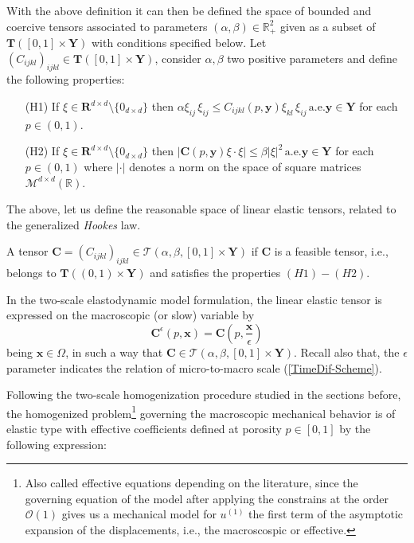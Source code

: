 With the above definition it can then be defined the space of bounded and coercive tensors associated to parameters $(\alpha,\beta) \in \mathbb{R}^2_+$ given as a subset of $\mathbf{T}([0,1]\times \mathbf{Y})$ with conditions specified below.
Let $(C_{ijkl})_{ijkl} \in \mathbf{T}([0,1]\times \mathbf{Y})$, consider $\alpha, \beta$ two positive parameters and define the following properties:
\begin{enumerate}
    \item[(H1)] If $\xi \in \mathbf{R}^{d\times d} \setminus \{0_{d \times d}\}$ then $\alpha \xi_{ij} \, \xi_{ij} \leq C_{ijkl}(p,\mathbf{y})  \xi_{kl}\,\xi_{ij}\, \text{a.e.} \mathbf{y} \in \mathbf{Y}$ for each $p \in (0,1)$.
    \item[(H2)] If $\xi \in \mathbf{R}^{d\times d} \setminus \{0_{d \times d}\}$ then $\vert \mathbf{C}(p,\mathbf{y}) \xi\cdot \xi \vert \leq \beta \vert \xi \vert^2 \, \text{a.e.}\mathbf{y} \in \mathbf{Y}$ for each $p \in (0,1)$ where $\vert \cdot \vert$ denotes a norm on the space of square matrices $\mathcal{M}^{d\times d}(\mathbb{R})$.
\end{enumerate}
The above, let us define the reasonable space of linear elastic tensors, related to the generalized \textit{Hookes} law.
\begin{defn}
A tensor $\mathbf{C} = (C_{ijkl})_{ijkl} \in \mathcal{T}(\alpha, \beta, [0,1]\times \mathbf{Y})$
if $\mathbf{C}$ is a feasible tensor, i.e., belongs to $\mathbf{T}((0,1)\times \mathbf{Y})$ and satisfies the properties $(H1)-(H2)$.
\end{defn}
\begin{rem}
In the two-scale elastodynamic model formulation, the linear elastic tensor is expressed on the macroscopic (or slow) variable by
\begin{equation*}
    \mathbf{C}^{\epsilon}(p,\mathbf{x}) =\mathbf{C}(p,\frac{\mathbf{x}}{\epsilon})
\end{equation*} being $\mathbf{x}\in \Omega$, in such a way that $\mathbf{C} \in \mathcal{T}(\alpha, \beta, [0,1]\times \mathbf{Y})$. Recall also that, the $\epsilon$ parameter indicates the relation of micro-to-macro scale (\ref{TimeDif-Scheme}).
\end{rem}
Following the two-scale homogenization procedure studied in the sections before, the homogenized problem\footnote{Also called effective equations depending on the literature, since the governing equation of the model after applying the constrains at the order $\mathcal{O}(1)$ gives us a mechanical model for $u^{(1)}$ the first term of the asymptotic expansion of the displacements, i.e., the macroscospic or effective.} governing the macroscopic mechanical behavior is of elastic type with effective coefficients defined at porosity $p \in [0,1]$ by the following expression:

